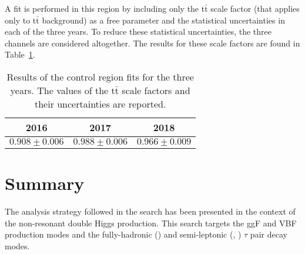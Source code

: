 \documentclass[../main.tex]{subfiles}
\begin{document}
A fit is performed in this region by including only the t$\bar{\text{t}}$ scale factor (that applies only to t$\bar{\text{t}}$ background) as a free parameter and the statistical uncertainties in each of the three years. To reduce these statistical uncertainties, the three channels are considered altogether. The results for these scale factors are found in Table~\ref{hh:tab:ttsf}.

\begin{table}[h!]
\begin{center}
\begin{tabular}{c | c | c}
2016 & 2017 & 2018 \\
\hline
$0.908 \pm 0.006$ &  $0.988 \pm 0.006$ & $0.966 \pm 0.009$
\end{tabular}
\end{center}
\caption[\ttbar{} scale factors]{Results of the \ttbar{} control region fits for the three years. The values of the t$\bar{\text{t}}$ scale factors and their uncertainties are reported.}
\label{hh:tab:ttsf}
\end{table}


















\section{Summary}

The analysis strategy followed in the \hhbbtt{} search has been presented in the context of the non-resonant double Higgs production. This search targets the ggF and VBF production modes and the fully-hadronic (\tauh\tauh{}) and semi-leptonic (\taue\tauh{}, \taumu\tauh{}) $\tau$ pair decay modes.
\end{document}
